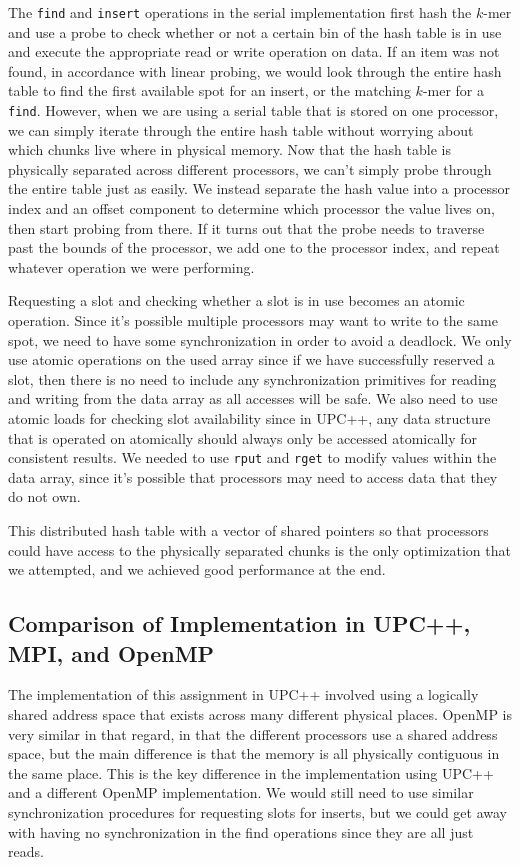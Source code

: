 \documentclass{article}
\begin{document}
The \verb|find| and \verb|insert| operations in the serial implementation first hash the $k$-mer and use a probe to check whether or not a certain bin of the hash table is in use and execute the appropriate read or write operation on data. If an item was not found, in accordance with linear probing, we would look through the entire hash table to find the first available spot for an insert, or the matching $k$-mer for a \verb|find|. However, when we are using a serial table that is stored on one processor, we can simply iterate through the entire hash table without worrying about which chunks live where in physical memory. Now that the hash table is physically separated across different processors, we can’t simply probe through the entire table just as easily. We instead separate the hash value into a processor index and an offset component to determine which processor the value lives on, then start probing from there. If it turns out that the probe needs to traverse past the bounds of the processor, we add one to the processor index, and repeat whatever operation we were performing.

Requesting a slot and checking whether a slot is in use becomes an atomic operation. Since it’s possible multiple processors may want to write to the same spot, we need to have some synchronization in order to avoid a deadlock. We only use atomic operations on the used array since if we have successfully reserved a slot, then there is no need to include any synchronization primitives for reading and writing from the data array as all accesses will be safe. We also need to use atomic loads for checking slot availability since in UPC++, any data structure that is operated on atomically should always only be accessed atomically for consistent results. We needed to use \verb|rput| and \verb|rget| to modify values within the data array, since it’s possible that processors may need to access data that they do not own.

This distributed hash table with a vector of shared pointers so that processors could have access to the physically separated chunks is the only optimization that we attempted, and we achieved good performance at the end.

\subsection{Comparison of Implementation in UPC++, MPI, and OpenMP}

The implementation of this assignment in UPC++ involved using a logically shared address space that exists across many different physical places. OpenMP is very similar in that regard, in that the different processors use a shared address space, but the main difference is that the memory is all physically contiguous in the same place. This is the key difference in the implementation using UPC++ and a different OpenMP implementation. We would still need to use similar synchronization procedures for requesting slots for inserts, but we could get away with having no synchronization in the find operations since they are all just reads.
\end{document}
